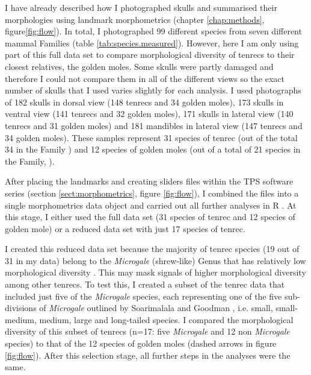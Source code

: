 	I have already described how I photographed skulls and summarised their morphologies using landmark morphometrics (chapter \ref{chap:methods}, figure\ref{fig:flow}). In total, I photographed 99 different species from seven different mammal Families (table \ref{tab:species.measured}). However, here I am only using part of this full data set to compare morphological diversity of tenrecs to their closest relatives, the golden moles. Some skulls were partly damaged and therefore I could not compare them in all of the different views so the exact number of skulls that I used varies slightly for each analysis. I used photographs of 182 skulls in dorsal view (148 tenrecs and 34 golden moles), 173 skulls in ventral view (141 tenrecs and 32 golden moles), 171 skulls in lateral view (140 tenrecs and 31 golden moles) and 181 mandibles in lateral view (147 tenrecs and 34 golden moles). These samples represent 31 species of tenrec (out of the total 34 in the Family \citep{Olson2013}) and 12 species of golden moles (out of a total of 21 species in the Family, \citep{Asher2010}).
	

	After placing the landmarks and creating sliders files within the TPS software series (section \ref{sect:morphometrics}, figure \ref{fig:flow}), I combined the files into a single morphometrics data object and carried out all further analyses in R \citep{Team2014}. At this stage, I either used the full data set (31 species of tenrec and 12 species of golden mole) or a reduced data set with just 17 species of tenrec. 
	
	
	I created this reduced data set because the majority of tenrec species (19 out of 31 in my data) belong to the \textit{Microgale} (shrew-like) Genus that has relatively low morphological diversity \citep{Soarimalala2011, Jenkins2003}. This may mask signals of higher morphological diversity among other tenrecs. To test this, I created a subset of the tenrec data that included just five of the \textit{Microgale} species, each representing one of the five sub-divisions of \textit{Microgale} outlined by Soarimalala and Goodman \citeyearpar{Soarimalala2011}, i.e. small, small-medium, medium, large and long-tailed species. I compared the morphological diversity of this subset of tenrecs (n=17: five \textit{Microgale} and 12 non \textit{Microgale} species) to that of the 12 species of golden moles (dashed arrows in figure \ref{fig:flow}). After this selection stage, all further steps in the analyses were the same.
	
